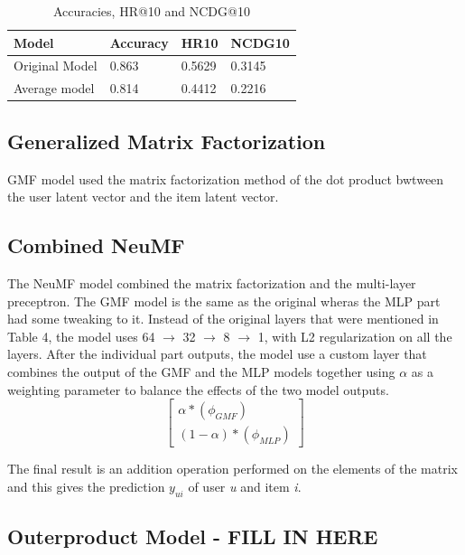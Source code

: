 \documentclass{article}
\begin{document}
\begin{table}[h]
\caption{Accuracies, HR@10 and NCDG@10}
\centering
\begin{tabular}{llll}
\toprule
Model & Accuracy & HR10 & NCDG10 \\
\midrule
Original Model & 0.863 & 0.5629 & 0.3145 \\
Average model & 0.814 & 0.4412 & 0.2216 \\
\bottomrule
\end{tabular}
\label{tab:table6}
\end{table}

\subsection{Generalized Matrix Factorization}
GMF model used the matrix factorization method of the dot product bwtween the user latent vector and the item latent vector.

\subsection{Combined NeuMF}
The NeuMF model combined the matrix factorization and the multi-layer preceptron. The GMF model is the same as the original wheras the MLP part had some tweaking to it. Instead of the original layers that were mentioned in Table 4, the model uses 64 $\rightarrow$ 32 $\rightarrow$ 8 $\rightarrow$ 1, with L2 regularization on all the layers. After the individual part outputs, the model use a custom layer that combines the output of the GMF and the MLP models together using $\alpha$ as a weighting parameter to balance the effects of the two model outputs.\\

\[
\begin{bmatrix}
    \alpha * (\phi_{GMF}) \\
    (1 - \alpha) * (\phi_{MLP})  
\end{bmatrix}
\]

The final result is an addition operation performed on the elements of the matrix and this gives the prediction $y_{ui}$ of user \emph{u} and item \emph{i}.

\subsection{Outerproduct Model - FILL IN HERE}
\end{document}
